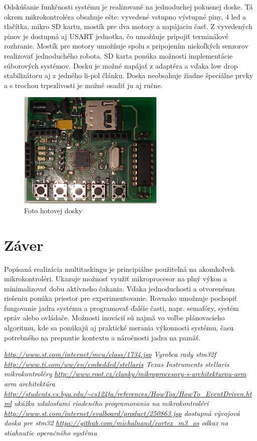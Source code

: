 \documentclass[twoside]{oss-conf}
\begin{document}
Odskúšanie funkčnosti systému je realizované na jednoduchej pokusnej doske. Tá okrem mikrokontroléra obsahuje ešte:
vyvedené vstupno výstupné piny, 4 led a tlačítka, mikro SD kartu, mostík pre dva motory a napájaciu časť.
Z vyvedených pinov je dostupná aj USART jednotka, čo umožňuje pripojiť terminálové rozhranie. Mostík pre motory umožňuje spolu s pripojením niekoľkých senzorov realizovať jednoduchého robota. SD karta ponúka možnosti implementácie súborových systémov. Dosku je možné napájať z adaptéra a vďaka low drop stabilizátoru aj z jedného li-pol článku. Doska neobsahuje žiadne špeciálne prvky a s trochou trpezlivosti je možné osadiť ju aj ručne.
\begin{figure}[ht]
\includegraphics[width=7cm]{test_board.jpg}
\caption{Foto hotovej dosky}
\label{picture1}
\end{figure}

\section{Záver}
 Popísaná realizácia multitaskingu je principiálne použiteľná na akomkoľvek mikrokontroléri. Ukazuje možnosť využiť
mikroprocesor na plný výkon a minimalizovať dobu aktívneho čakania. Vďaka jednoduchosti a otvorenému riešeniu ponúka
priestor pre experimentovanie. Rovnako umožnuje pochopiť fungovanie jadra systému a programovať ďalšie časti, napr. 
semafóry, systém správ alebo ovládače. Možnosti inovácií sú najmä vo voľbe plánovacieho algoritmu, kde sa ponúkajú aj
praktické merania výkonnosti systému, času potrebného na prepnutie kontextu a náročnosti jadra na pamäť.

\begin{thebibliography}{9}
{\it \url{http://www.st.com/internet/mcu/class/1734.jsp} Vyrobca rady stm32f}
{\it \url{http://www.ti.com/ww/en/embedded/stellaris} Texas Instruments stellaris mikrokontroléry}
{\it \url{http://www.root.cz/clanky/mikroprocesory-s-architekturou-arm} arm architektúra}
{\it \url{http://students.cs.byu.edu/~cs124ta/references/HowTos/HowTo_EventDriven.html} ukážka udalosťami riadeného programovania na mikrokontroléri}
{\it \url{http://www.st.com/internet/evalboard/product/250863.jsp} dostupná vývojová doska pre stm32}
{\it \url{https://github.com/michalnand/cortex_m3_os} odkaz na stiahnutie operačného systému}
\end{thebibliography}
\end{document}
